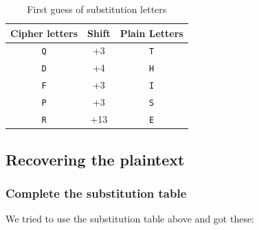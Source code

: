                 \begin{table}[h]
                    \centering
                    \begin{tabular}{|c|c|c|}
                        \toprule
                        Cipher letters & Shift & Plain Letters \\
                        \midrule
                        \texttt{Q} & +3 & \texttt{T} \\
                        \texttt{D} & +4 & \texttt{H} \\
                        \texttt{F} & +3 & \texttt{I} \\
                        \texttt{P} & +3 & \texttt{S} \\
                        \texttt{R} & +13 & \texttt{E} \\
                        \bottomrule
                    \end{tabular}
                    \caption{First guess of substitution letters}
                    \label{tab:first_sub_table}
                \end{table}

        \subsection{Recovering the plaintext}

            \subsubsection{Complete the substitution table}
                We tried to use the substitution table above and got these:

